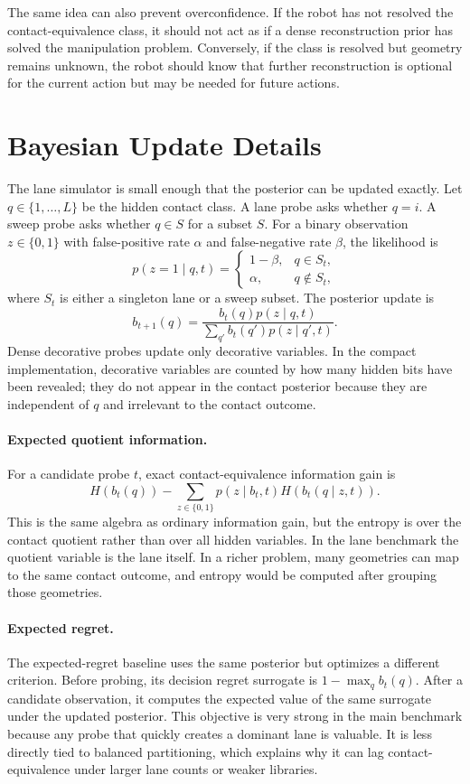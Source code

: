 \documentclass{article}
\begin{document}
The same idea can also prevent overconfidence. If the robot has not resolved the contact-equivalence class, it should not act as if a dense reconstruction prior has solved the manipulation problem. Conversely, if the class is resolved but geometry remains unknown, the robot should know that further reconstruction is optional for the current action but may be needed for future actions.

\section{Bayesian Update Details}

The lane simulator is small enough that the posterior can be updated exactly. Let $q\in\{1,\ldots,L\}$ be the hidden contact class. A lane probe asks whether $q=i$. A sweep probe asks whether $q\in S$ for a subset $S$. For a binary observation $z\in\{0,1\}$ with false-positive rate $\alpha$ and false-negative rate $\beta$, the likelihood is
\[
    p(z=1\mid q,t)=
    \begin{cases}
    1-\beta, & q\in S_t,\\
    \alpha, & q\notin S_t,
    \end{cases}
\]
where $S_t$ is either a singleton lane or a sweep subset. The posterior update is
\[
    b_{t+1}(q)=
    \frac{b_t(q)p(z\mid q,t)}
    {\sum_{q'} b_t(q')p(z\mid q',t)}.
\]
Dense decorative probes update only decorative variables. In the compact implementation, decorative variables are counted by how many hidden bits have been revealed; they do not appear in the contact posterior because they are independent of $q$ and irrelevant to the contact outcome.

\paragraph{Expected quotient information.}
For a candidate probe $t$, exact contact-equivalence information gain is
\[
    H(b_t(q)) -
    \sum_{z\in\{0,1\}} p(z\mid b_t,t)H(b_t(q\mid z,t)).
\]
This is the same algebra as ordinary information gain, but the entropy is over the contact quotient rather than over all hidden variables. In the lane benchmark the quotient variable is the lane itself. In a richer problem, many geometries can map to the same contact outcome, and entropy would be computed after grouping those geometries.

\paragraph{Expected regret.}
The expected-regret baseline uses the same posterior but optimizes a different criterion. Before probing, its decision regret surrogate is $1-\max_q b_t(q)$. After a candidate observation, it computes the expected value of the same surrogate under the updated posterior. This objective is very strong in the main benchmark because any probe that quickly creates a dominant lane is valuable. It is less directly tied to balanced partitioning, which explains why it can lag contact-equivalence under larger lane counts or weaker libraries.
\end{document}
